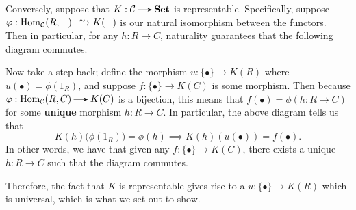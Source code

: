 \begin{prf}
        Conversely, suppose that $K: \cc \to \textbf{Set}$ is representable. Specifically, suppose 
        $\phi: \hom_{\cc}(R, -) \isomarrow K(-)$ is our natural isomorphism between the functors. 
        Then in particular, for any $h: R \to C$, naturality guarantees that the following 
        diagram commutes. 
        \begin{center}
            \hspace{1cm}
        \end{center}
        Now take a step back; define the morphism $u: \{\bullet\} \to K(R)$ where 
        $u(\bullet) = \phi(1_R)$, and suppose $f: \{\bullet\} \to K(C)$ is some morphism. Then 
        because $\phi: \hom_{\cc}(R, C) \to K(C)$ is a bijection, this means that 
        $f(\bullet) = \phi(h: R \to C)$ for some \textbf{unique} morphism $h: R \to C$. In particular, the 
        above diagram tells us that 
        \[
            K(h)\big(\phi(1_R)\big) = \phi(h) \implies K(h)(u(\bullet)) = f(\bullet).
        \]
        In other words, we have that given any $f:\{\bullet\} \to K(C)$, 
        there exists a unique $h: R \to C$ such that the diagram commutes. 
        \begin{center}
        \end{center}
        Therefore, the fact that $K$ is representable gives 
        rise to a $u: \{\bullet\} \to K(R)$ which is universal, which is what we set 
        out to show.
    \end{prf}

